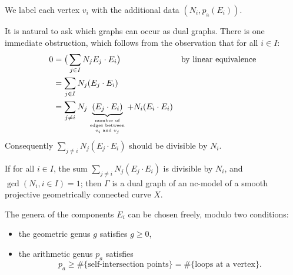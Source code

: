 We label each vertex $v_{i}$ with the additional data $(N_{i}, p_{\textrm{a}}(E_{i}))$.

It is natural to ask which graphs can occur as dual graphs. There is one
immediate obstruction, which follows from the observation that for all $i \in
I$:
\begin{align*}
	0 &= \big(\sum_{j \in I} N_{j}E_{j} \cdot E_{i}\big) &&\text{by linear equivalence} \\
	&= \sum_{j \in I} N_{j} (E_{j} \cdot E_{i}) \\
	&= \sum_{j \ne i} N_{j} \underbrace{(E_{j} \cdot E_{i})}_{\parbox{4.5em}{\tiny \centering number of edges between $v_{i}$ and $v_{j}$}} + N_{i}(E_{i} \cdot E_{i})
\end{align*}
Consequently $\sum_{j \ne i} N_{j} (E_{j} \cdot E_{i})$ should be divisible by $N_{i}$.
\begin{theorem}[Winters]
	If for all $i \in I$, the sum $\sum_{j \ne i} N_{j} (E_{j} \cdot
	E_{i})$ is divisible by $N_{i}$, and $\gcd(N_{i}, i \in I) = 1$; then
	$\Gamma$ is a dual graph of an nc-model of a smooth projective
	geometrically connected curve $X$.

	The genera of the components $E_i$ can be chosen freely, modulo two
	conditions:
	\begin{itemize}
		\item the geometric genus $g$ satisfies $g \geq 0$,
		\item the arithmetic genus $p_a$ satisfies
			\[
				p_a \geq \#\{\text{self-intersection points}\}
				= \#\{\text{loops at a vertex}\}.
			\]
	\end{itemize}
\end{theorem}
